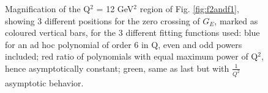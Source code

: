 \begin{figure}
\begin{center}
\caption{Magnification of the Q$^2$ = 12 GeV$^2$ region of Fig. \ref{fig:f2andf1}, showing 3 different positions for the zero crossing of $G_E$, marked as coloured 
vertical bars, for the 3 different fitting functions used: blue for an ad hoc polynomial of order 6 in Q, even and odd powers included; red ratio of polynomials with equal maximum power of Q$^2$, hence asymptotically constant; green, same as last but with $\frac{1}{Q^2}$ asymptotic behavior.}
\label{fig:f2andf1magn}
\end{center}
\end{figure}


%




